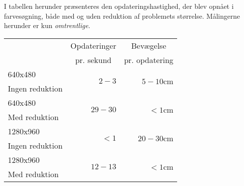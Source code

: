 I tabellen herunder præsenteres den opdateringshastighed, der blev opnået i farvesøgning, både med og uden reduktion af problemets størrelse.
Målingerne herunder er kun \emph{omtrentlige}.

{
\newcommand{\mr}[1]{\multirow{2}{*}{#1}}
\newcommand{\ce}[1]{\multicolumn{1}{c|}{#1}}

\begin{center}
\begin{tabular}{| l | r | r |}
\hline
& \ce{Opdateringer} & \ce{Bevægelse}\\
& \ce{pr. sekund} & \ce{pr. opdatering}\\\hline
640x480&\mr{$2-3$}&\mr{$5-10$cm}\\
Ingen reduktion&&\\\hline
640x480&\mr{$29-30$}&\mr{$<1$cm}\\
Med reduktion&&\\\hline
1280x960&\mr{$<1$}&\mr{$20-30$cm}\\
Ingen reduktion&&\\\hline
1280x960&\mr{$12-13$}&\mr{$<1$cm}\\
Med reduktion&&\\\hline
\end{tabular}
\end{center}}
%
%
%
%
%
%
%
